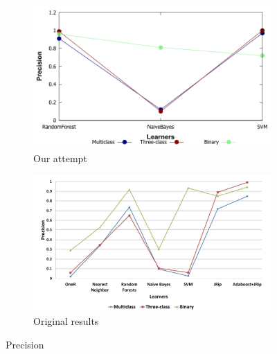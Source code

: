 \begin{figure}[H]
    \centering
    \begin{subfigure}[t]{0.5\textwidth}
        \includegraphics[width=\linewidth]{images/weka_precision}
        \caption{Our attempt}
    \end{subfigure}%
    \begin{subfigure}[t]{0.5\textwidth}
        \includegraphics[width=\linewidth]{images/weka_precision_cite.png}
        \caption{Original results \cite{borges_hink_machine_2014-1}}
    \end{subfigure}
    \caption{Precision}
    \label{fig:weka_prec}
\end{figure}

